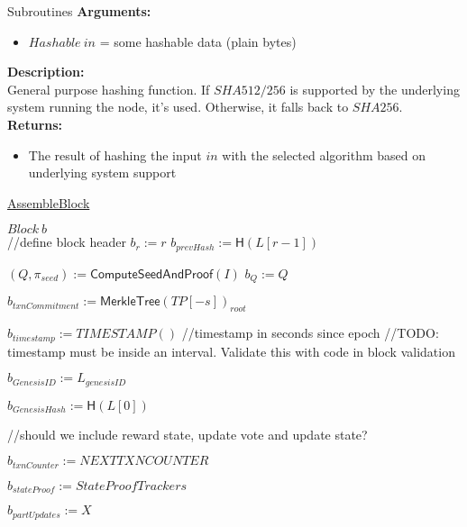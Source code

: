 \documentclass[10pt,a4paper]{article}
\begin{document}
\begin{section}{Subroutines}
\noindent \textbf{Arguments:}
\begin{itemize}
    \item $Hashable \ in$ = some hashable data (plain bytes)
  \end{itemize}

\noindent \textbf{Description:}\\
General purpose hashing function. If $SHA512/256$ is supported by the underlying system running the node, it's used.
Otherwise, it falls back to $SHA256$.\\

\noindent \textbf{Returns:}
\begin{itemize}
    \item The result of hashing the input $in$ with the selected algorithm based on underlying system support
  \end{itemize}


\begin{algorithm}[H]
    \caption{\underline{AssembleBlock}}    
    \label{algo:assemble-block}
    \begin{algorithmic}[1]

    \State $Block \ b$ \\

    //define block header
    \State $b_{r} := r$
    \State $b_{prevHash} := \mathsf{H}(L[r-1])$
    
    \State $(Q, \pi_{seed}) := \mathsf{ComputeSeedAndProof}(I)$
    \State $b_{Q} := Q$

    \State $b_{txnCommitment} := \mathsf{MerkleTree}(TP[-s])_{root}$

    \State $b_{timestamp} := TIMESTAMP()$ //timestamp in seconds since epoch
    //TODO: timestamp must be inside an interval. Validate this with code in block validation

    \State $b_{GenesisID} := L_{genesisID}$

    \State $b_{GenesisHash} := \mathsf{H}(L[0])$

    //should we include reward state, update vote and update state?

    \State $b_{txnCounter} := NEXTTXNCOUNTER$

    \State $b_{stateProof} := StateProofTrackers$

    \State $b_{partUpdates} := X$ \\ \\



\end{algorithmic}
\end{algorithm}
\end{section}
\end{document}
